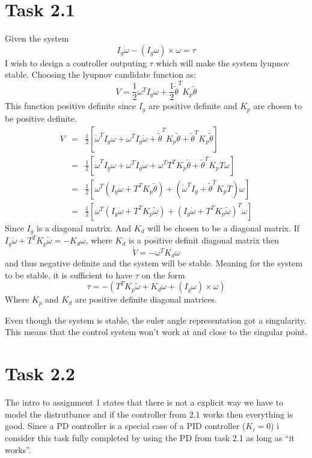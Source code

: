 \documentclass[11pt]{article}
\begin{document}
\section*{Task 2.1}
Given the system
\[I_g \dot \omega - (I_g \omega) \times \omega = \tau \]
I wish to design a controller outputing $\tau$ which will make the system lyupnov stable. Choosing the lyupnov candidate function as:
\[V = \frac{1}{2} \omega^T I_g \omega + \frac{1}{2} \dot \tilde \theta^T K_p \tilde \theta \]
This function  positive definite since $I_g$ are positive definite and $K_p$ are chosen to be positive definite.
\begin{eqnarray*}
\dot V &=& \frac{1}{2} [ \dot \omega^T I_g \omega + \omega^T I_g \dot \omega + \dot \tilde \theta^T K_p \tilde \theta + \tilde \theta^T K_p \dot \tilde \theta ] \\
&=& \frac{1}{2} [ \dot \omega^T I_g \omega + \omega^T I_g \dot \omega + \omega^T T^T K_p \tilde \theta + \tilde \theta^T K_p T \omega ] \\
&=& \frac{1}{2} [\omega^T ( I_g \dot \omega + T^T K_p \tilde \theta) + (\dot \omega^T I_g + \tilde \theta^T K_p T) \omega ] \\
&=& \frac{1}{2} [\omega^T (I_g \dot \omega + T^T K_p \tilde \omega) + (I_g \dot \omega + T^T K_p \tilde \omega)^T \omega ] 
\end{eqnarray*}
Since $I_g$ is a diagonal matrix. And $K_d$ will be chosen to be a diagonal matrix. If $I_g \dot \omega + T^T K_p \tilde \omega = - K_d \omega$, where $K_d$ is a positive definit diagonal matrix then 
\[\dot V = - \omega^T K_d \omega \]
and thus negative definite and the system will be stable. Meaning for the system to be stable, it is sufficient to have $\tau$ on the form
\[ \tau = -(T^T K_p \tilde \omega + K_d \omega + (I_g \omega) \times \omega) \]
Where $K_p$ and $K_d$ are positive definite diagonal matrices.

Even though the system is stable, the euler angle representation got a singularity. This means that the control system won't work at and close to the singular point.



\section*{Task 2.2}
The intro to assignment 1 states that there is not a explicit way we have to model the distrutbance and if the controller from 2.1 works then everything is good. Since a PD controller is a special case of a PID controller ($K_i = 0$) i consider this task fully completed by using the PD from task 2.1 as long as ``it works''. 
\end{document}
